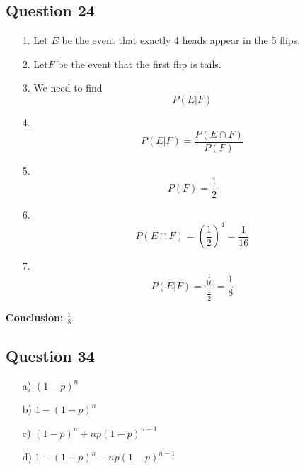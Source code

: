 \documentclass{article}
\begin{document}
\subsection*{Question 24}
\begin{itemize}
    \item[1.] Let \( E \) be the event that exactly 4 heads appear in the 5 flips. \\
    \item[2.] Let\( F \) be the event that the first flip is tails.
    \item[3.] We need to find \[ P(E|F) \]
    \item[4.] \[ P(E|F) = \frac{P(E \cap F)}{P(F)} \]
    \item[5.] \[ P(F) = \frac{1}{2} \]
    \item[6.] \[ P(E \cap F) = \left(\frac{1}{2}\right)^4 = \frac{1}{16} \]
    \item[7.] \[ P(E | F) = \frac{\frac{1}{16}}{\frac{1}{2}} = \frac{1}{8} \]
\end{itemize}
\textbf{Conclusion:} {\( \frac{1}{8} \)}
\subsection*{Question 34}
\begin{itemize}
    \item[a)] \( (1 - p)^n \)
    \item[b)] \( 1 - (1 - p)^n \)
    \item[c)] \( (1 - p)^n + n p (1 - p)^{n - 1} \)
    \item[d)] \( 1 - (1 - p)^n - n p (1 - p)^{n - 1} \)
\end{itemize}
\end{document}
